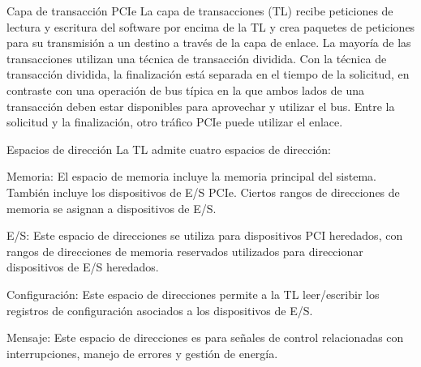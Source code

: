\documentclass[presentation]{beamer}
\begin{document}
\begin{frame}[label={sec:org5b1baf7}]{Capa de transacción PCIe}
La capa de transacciones (TL) recibe peticiones de lectura y escritura del software por
encima de la TL y crea paquetes de peticiones para su transmisión a un destino a través de
la capa de enlace. La mayoría de las transacciones utilizan una técnica de transacción
dividida. Con la técnica de
transacción dividida, la finalización está separada en el tiempo de la solicitud, en contraste
con una operación de bus típica en la que ambos lados de una transacción deben estar
disponibles para aprovechar y utilizar el bus. Entre la solicitud y la finalización, otro
tráfico PCIe puede utilizar el enlace.
\end{frame}

\begin{frame}[label={sec:org69e1ea7}]{Espacios de dirección}
La TL admite cuatro espacios de dirección:

\alert{\alert{Memoria:}} El espacio de memoria incluye la memoria principal del sistema.
También incluye los dispositivos de E/S PCIe. Ciertos rangos de direcciones de
memoria se asignan a dispositivos de E/S.

\alert{\alert{E/S:}} Este espacio de direcciones se utiliza para dispositivos PCI heredados, con
rangos de direcciones de memoria reservados utilizados para direccionar dispositivos
de E/S heredados.

\alert{\alert{Configuración:}} Este espacio de direcciones permite a la TL leer/escribir los registros de
configuración asociados a los dispositivos de E/S.

\alert{\alert{Mensaje:}} Este espacio de direcciones es para señales de control relacionadas con
interrupciones, manejo de errores y gestión de energía.
\end{frame}
\end{document}
